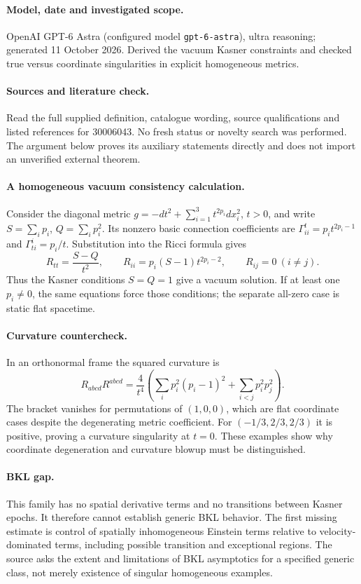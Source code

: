 \documentclass[11pt]{article}
\begin{document}
\paragraph{Model, date and investigated scope.}
OpenAI GPT-6 Astra (configured model \texttt{gpt-6-astra}), ultra reasoning; generated 11 October 2026. Derived the vacuum Kasner constraints and checked true versus coordinate singularities in explicit homogeneous metrics.

\paragraph{Sources and literature check.}
Read the full supplied definition, catalogue wording, source qualifications and listed references for 30006043. No fresh status or novelty search was performed. The argument below proves its auxiliary statements directly and does not import an unverified external theorem.

\paragraph{A homogeneous vacuum consistency calculation.} Consider the diagonal metric \(g=-dt^2+\sum_{i=1}^3t^{2p_i}dx_i^2\), \(t>0\), and write \(S=\sum_i p_i\), \(Q=\sum_i p_i^2\). Its nonzero basic connection coefficients are \(\Gamma^t_{ii}=p_it^{2p_i-1}\) and \(\Gamma^i_{ti}=p_i/t\). Substitution into the Ricci formula gives
\[
 R_{tt}=\frac{S-Q}{t^2},\qquad
 R_{ii}=p_i(S-1)t^{2p_i-2},\qquad R_{ij}=0\ (i\ne j).
\]
Thus the Kasner conditions \(S=Q=1\) give a vacuum solution. If at least one \(p_i\ne0\), the same equations force those conditions; the separate all-zero case is static flat spacetime.
\paragraph{Curvature countercheck.} In an orthonormal frame the squared curvature is
\[
 R_{abcd}R^{abcd}=\frac4{t^4}\left(\sum_i p_i^2(p_i-1)^2+\sum_{i<j}p_i^2p_j^2\right).
\]
The bracket vanishes for permutations of \((1,0,0)\), which are flat coordinate cases despite the degenerating metric coefficient. For \((-1/3,2/3,2/3)\) it is positive, proving a curvature singularity at \(t=0\). These examples show why coordinate degeneration and curvature blowup must be distinguished.
\paragraph{BKL gap.} This family has no spatial derivative terms and no transitions between Kasner epochs. It therefore cannot establish generic BKL behavior. The first missing estimate is control of spatially inhomogeneous Einstein terms relative to velocity-dominated terms, including possible transition and exceptional regions. The source asks the extent and limitations of BKL asymptotics for a specified generic class, not merely existence of singular homogeneous examples.
\end{document}
